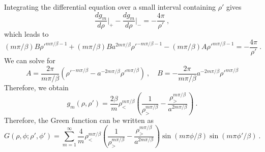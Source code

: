\documentclass[12pt]{article}
\newcommand{\lb}{\left(}
\newcommand{\rb}{\right)}
\newcommand{\mb}{{m \pi/\beta}}
\begin{document}
Integrating the differential equation over a small interval containing $\rho'$ gives
\begin{equation}
    \frac{d g_m}{d\rho} \Bigg|_{+} - \frac{d g_m}{d \rho}\Bigg|_{-} = -\frac{4\pi}{\rho'}~,
\end{equation}
which leads to
\begin{equation}
    (\mb) B \rho'^{\mb -1}+(\mb) B a^{2\mb}\rho'^{-\mb -1} - (\mb) A\rho'^{\mb -1} = -\frac{4\pi}{\rho'}~.
\end{equation}
We can solve for
\begin{equation}
    A = \frac{2\pi}{\mb} \lb \rho'^{-\mb} - a^{-2\mb} \rho'^\mb \rb~,\quad B = -\frac{2\pi}{\mb} a^{-2\mb} \rho'^{\mb}
\end{equation}
Therefore, we obtain
\begin{equation}
    \boxed{
        g_m(\rho, \rho') = \frac{2\beta}{m} \rho_<^\mb \lb \frac{1}{\rho_>^\mb} - \frac{\rho_>^\mb}{a^{2\mb}}\rb~.
    }
\end{equation}
Therefore, the Green function can be written as
\begin{equation}
    \boxed{
    G(\rho, \phi; \rho', \phi') = \sum_{m =1}^\infty \frac{4}{m} \rho_<^\mb \lb \frac{1}{\rho_>^\mb} - \frac{\rho_>^\mb}{a^{2\mb}}\rb\sin(m \pi \phi/\beta) \sin(m \pi \phi'/\beta)~.
    }
\end{equation}
\end{document}
